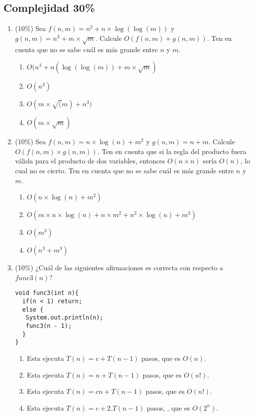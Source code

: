 \documentclass[10 pt]{article}
\begin{document}
\begin{multicols}{2}
\begin{enumerate}[label=(\alph*)]
\section{Complejidad 30\%}
\begin{enumerate}[label=\alph*]
\item (10\%) Sea $f(n, m) = n^2 + n \times \log(\log(m))$ y $ g(n, m) = n^3+m\times \sqrt{m}$. Calcule $O(f(n, m) + g(n, m))$. Ten en 
cuenta que no se sabe cuál es más grande entre $n$ y $m$.
\begin{enumerate}[label=(\roman*)]
\item $O(n^3 + n(\log(\log(m)) + m \times \sqrt{m})$
\item $O(n^3)$
\item $O(m \times \sqrt(m) + n^3)$
\item $O(m \times \sqrt{m})$
\end{enumerate}
\item (10\%) Sea $f(n, m) = n \times \log(n) + m ^ 2$ y $g(n, m) = n + m$. Calcule $O(f(n, m) \times g(n, m))$. Ten en cuenta que si la
regla del producto fuera válida para el producto de dos variables, entonces $O(n \times n)$ sería $O(n)$, lo cual no es cierto. Ten en 
cuenta que no se sabe cuál es más grande entre $n$ y $m$.
\begin{enumerate}[label=(\roman*)]
\item $O(n \times \log (n) + m^2)$
\item $O(m\times n \times \log(n) + n\times m^2 + n^2\times \log(n) + m^3)$
\item $O(m^3)$
\item $O(n^3 + m^3)$
\end{enumerate}
\item (10\%) ¿Cuál de las siguientes afirmaciones es correcta con respecto a $func3(n)$?
\begin{lstlisting}
void func3(int n){
  if(n < 1) return;
  else {
   System.out.println(n);
   func3(n - 1);
  }
}
\end{lstlisting}
\begin{enumerate}[label=(\roman*)]
\item Esta ejecuta $T(n) = c + T(n-1)$ pasos, que es $O(n)$.
\item Esta ejecuta $T(n) = n + T(n-1)$ pasos, que es $O(n!)$.
\item Esta ejecuta $T(n) = c n + T(n-1)$ pasos, que es $O(n!)$.
\item Esta ejecuta $T(n) = c + 2.T(n-1)$ pasos, , que es $O(2^n)$.
\end{enumerate}
\end{enumerate}
\end{enumerate}

\end{multicols}
\end{document}
